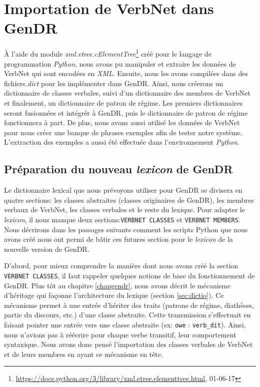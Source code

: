 \chapter{Importation de VerbNet dans GenDR}\label{ch:python}

À l'aide du module \emph{xml.etree.cElementTree}\footnote{\url{https://docs.python.org/3/library/xml.etree.elementtree.html}, 01-06-17} créé pour le langage de programmation \emph{Python}, nous avons pu manipuler et extraire les données de VerbNet qui sont encodées en \emph{XML}. Ensuite, nous les avons compilées dans des fichiers\emph{.dict} pour les implémenter dans GenDR. Ainsi, nous créerons un dictionnaire de classes verbales, suivi d'un dictionnaire des membres de VerbNet et finalement, un dictionnaire de patron de régime. Les premiers dictionnaires seront fusionnées et intégrér à GenDR, puis le dictionnaire de patron de régime fonctionnera à part. De plus, nous avons aussi utilisé les données de VerbNet pour nous créer une banque de phrases exemples afin de tester notre système. L'extraction des exemples a aussi été effectuée dans l'environnement \emph{Python}.
 
\section{Préparation du nouveau \emph{lexicon} de GenDR}

Le dictionnaire lexical que nous prévoyons utiliser pour GenDR se divisera en quatre sections: les classes abstraites (classes originaires de GenDR), les membres verbaux de VerbNet, les classes verbales et le reste du lexique. Pour adapter le \emph{lexicon}, il nous manque deux sections:\texttt{VERBNET CLASSES} et \texttt{VERBNET MEMBERS}. Nous décrirons dans les passages suivants comment les scripts Python que nous avons créé nous ont permi de bâtir ces futures section pour le \emph{lexicon} de la nouvelle version de GenDR.

D'abord, pour mieux comprendre la manière dont nous avons créé la section \texttt{VERBNET CLASSES}, il faut rappeler quelques notions de base du fonctionnement de GenDR. Plus tôt au chapitre \ref{chapgendr}, nous avons décrit le mécanisme d'héritage qui façonne l'architecture du lexique (section \ref{sec:dictio}). Ce mécanisme permet à une entrée d'hériter des traits (patrons de régime, diathèses, partie du discours, etc.) d'une classe abstraite. Cette transmission s'effectuait en faisant pointer une entrée vers une classe abstraite (ex: \texttt{owe} : \texttt{verb\_dit}). Ainsi, nous n'avions pas à réécrire pour chaque verbe transitif, leur comportement syntaxique. Nous avons donc pensé l'importation des classes verbales de VerbNet et de leurs membres en ayant ce mécanisme en tête.  

